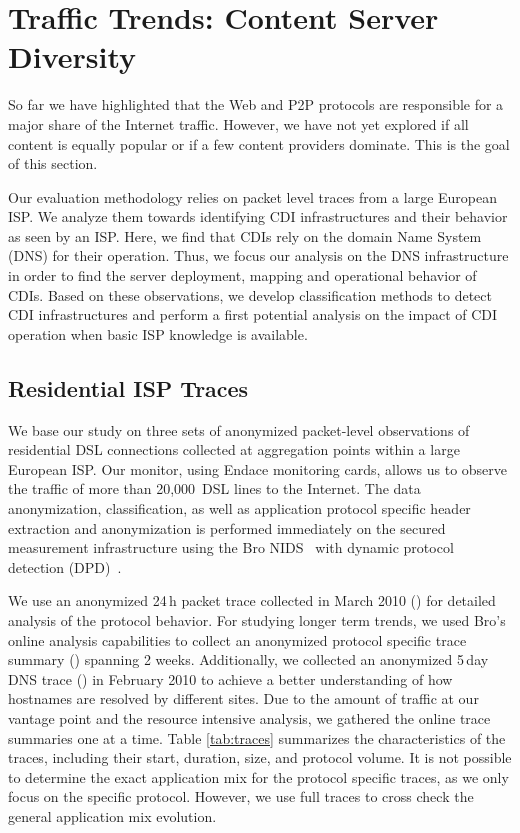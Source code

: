 \section{Traffic Trends: Content Server Diversity}\label{sec:traffic-diversity}

So far we have highlighted that the Web and P2P protocols are responsible for a
major share of the Internet traffic. However, we have not yet explored if all
content is equally popular or if a few content providers dominate. This is the
goal of this section.

Our evaluation methodology relies on packet level traces from a large European
ISP. We analyze them towards identifying CDI infrastructures and their behavior
as seen by an ISP. Here, we find that CDIs rely on the domain Name System (DNS)
for their operation. Thus, we focus our analysis on the DNS infrastructure in
order to find the server deployment, mapping and operational behavior of CDIs.
Based on these observations, we develop classification methods to detect CDI
infrastructures and perform a first potential analysis on the impact of CDI
operation when basic ISP knowledge is available.

\subsection{Residential ISP Traces}\label{sec:traces} We base our study on
three sets of anonymized packet-level observations of residential DSL
connections collected at aggregation points within a large European ISP.  Our
monitor, using Endace monitoring cards, allows us to observe the traffic of
more than 20,000~DSL lines to the Internet.  The data anonymization,
classification, as well as application protocol specific header extraction and
anonymization is performed immediately on the secured measurement
infrastructure using the Bro NIDS~\cite{bro-paper} with dynamic protocol
detection (DPD)~\cite {dreger06dpd}.

We use an anonymized 24\,h packet trace collected in March 2010 (\martrace) for
detailed analysis of the protocol behavior. For studying longer term trends, we
used Bro's online analysis capabilities to collect an anonymized protocol
specific trace summary (\httplong) spanning 2 weeks. Additionally, we collected
an anonymized 5\,day DNS trace (\dnslong) in February 2010 to achieve a better
understanding of how hostnames are resolved by different sites. Due to the
amount of traffic at our vantage point and the resource intensive analysis, we
gathered the online trace summaries one at a time. Table \ref{tab:traces}
summarizes the characteristics of the traces, including their start, duration,
size, and protocol volume.  It is not possible to determine the exact
application mix for the protocol specific traces, as we only focus on the
specific protocol.  However, we use full traces to cross check the general
application mix evolution.

